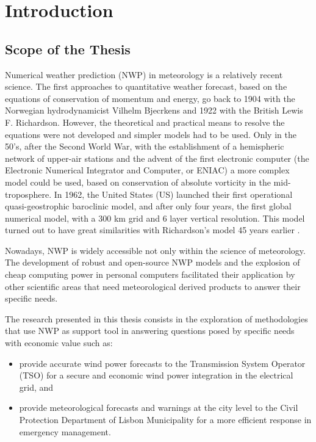 \chapter{Introduction}\label{sec:intro}

\section{Scope of the Thesis}

Numerical weather prediction (NWP) in meteorology is a relatively recent science. The first approaches to quantitative weather forecast, based on the equations of conservation of momentum and energy, go back to 1904 with the Norwegian hydrodynamicist Vilhelm Bjecrkens and 1922 with the British Lewis F. Richardson. However, the theoretical and practical means to resolve the equations were not developed and simpler models had to be used. Only in the 50's, after the Second World War, with the establishment of a hemispheric network of upper-air stations and the advent of the first electronic computer (the Electronic Numerical Integrator and Computer, or ENIAC) a more complex model could be used, based on conservation of absolute vorticity in the mid-troposphere\citep{Charney1950}. In 1962, the United States (US) launched their first operational quasi-geostrophic baroclinic model, and after only four years, the first global numerical model, with a 300 km grid and 6 layer vertical resolution. This model turned out to have great similarities with Richardson's model 45 years earlier \citep{ECMWF2007}. 

Nowadays, NWP is widely accessible not only within the science of meteorology. The development of robust and open-source NWP models and the explosion of cheap computing power in personal computers facilitated their application by other scientific areas that need meteorological derived products to answer their specific needs. 

The research presented in this thesis consists in the exploration of methodologies that use NWP as support tool in answering questions posed by specific needs with economic value such as:

\begin{itemize}
    \item provide accurate wind power forecasts to the Transmission System Operator (TSO) for a secure and economic wind power integration in the electrical grid, and
    \item provide meteorological forecasts and warnings at the city level to the Civil Protection Department of Lisbon Municipality for a more efficient response in emergency management.
\end{itemize}


